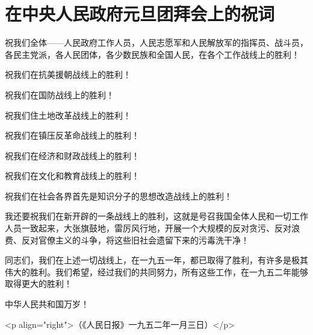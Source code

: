 \section[在中央人民政府元旦团拜会上的祝词（一九五二年一月一日）]{在中央人民政府元旦团拜会上的祝词}


祝我们全体——人民政府工作人员，人民志愿军和人民解放军的指挥员、战斗员，各民主党派，各人民团体，各少数民族和全国人民，在各个工作战线上的胜利！

祝我们在抗美援朝战线上的胜利！

祝我们在国防战线上的胜利！

祝我们住土地改革战线上的胜利！

祝我们在镇压反革命战线上的胜利！

祝我们在经济和财政战线上的胜利！

祝我们在文化和教育战线上的胜利！

祝我们在社会各界首先是知识分子的思想改造战线上的胜利！

我还要祝我们在新开辟的一条战线上的胜利，这就是号召我国全体人民和一切工作人员一致起来，大张旗鼓地，雷厉风行地，开展一个大规模的反对贪污、反对浪费、反对官僚主义的斗争，将这些旧社会遗留下来的污毒洗干净！

同志们，我们在上述一切战线上，在一九五一年，都已取得了胜利，有许多是极其伟大的胜利。我们希望，经过我们的共同努力，所有这些工作，在一九五二年能够取得更大的胜利！

中华人民共和国万岁！

<p align="right">（《人民日报》一九五二年一月三日）</p>


